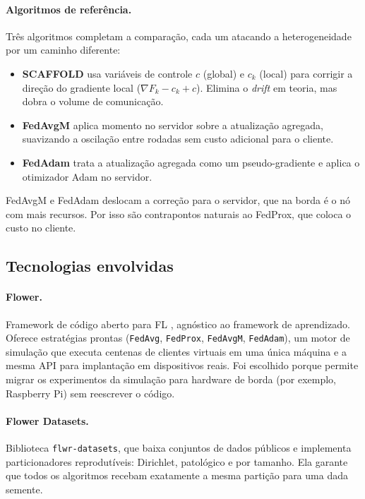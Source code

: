 \paragraph{Algoritmos de referência.}
Três algoritmos completam a comparação, cada um atacando a heterogeneidade por um caminho diferente:
\begin{itemize}[leftmargin=*, itemsep=1pt]
    \item \textbf{SCAFFOLD} \citep{karimireddy2020scaffold} usa variáveis de controle $c$ (global) e $c_k$ (local) para corrigir a direção do gradiente local ($\nabla F_k - c_k + c$). Elimina o \textit{drift} em teoria, mas dobra o volume de comunicação.
    \item \textbf{FedAvgM} \citep{hsu2019fedavgm} aplica momento no servidor sobre a atualização agregada, suavizando a oscilação entre rodadas sem custo adicional para o cliente.
    \item \textbf{FedAdam} \citep{reddi2021adaptive} trata a atualização agregada como um pseudo-gradiente e aplica o otimizador Adam no servidor.
\end{itemize}
FedAvgM e FedAdam deslocam a correção para o servidor, que na borda é o nó com mais recursos. Por isso são contrapontos naturais ao FedProx, que coloca o custo no cliente.

\subsection{Tecnologias envolvidas}

\paragraph{Flower.} Framework de código aberto para FL \citep{beutel2020flower}, agnóstico ao framework de aprendizado. Oferece estratégias prontas (\texttt{FedAvg}, \texttt{FedProx}, \texttt{FedAvgM}, \texttt{FedAdam}), um motor de simulação que executa centenas de clientes virtuais em uma única máquina e a mesma API para implantação em dispositivos reais. Foi escolhido porque permite migrar os experimentos da simulação para hardware de borda (por exemplo, Raspberry Pi) sem reescrever o código.

\paragraph{Flower Datasets.} Biblioteca \texttt{flwr-datasets}, que baixa conjuntos de dados públicos e implementa particionadores reprodutíveis: Dirichlet, patológico e por tamanho. Ela garante que todos os algoritmos recebam exatamente a mesma partição para uma dada semente.

